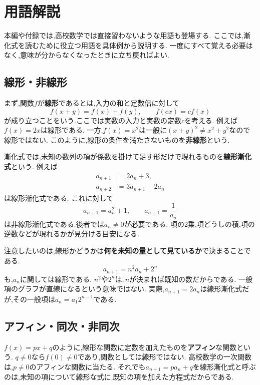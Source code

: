 
\section{用語解説}\label{節：用語解説}
  本編や付録では,高校数学では直接習わないような用語も登場する.
  ここでは,漸化式を読むために役立つ用語を具体例から説明する.
  一度にすべて覚える必要はなく,意味が分からなくなったときに立ち戻ればよい.

  \subsection{線形・非線形}\label{節：用語解説：線形・非線形}
    まず,関数$f$が\textbf{線形}であるとは,入力の和と定数倍に対して
    \[
      f(x+y)=f(x)+f(y),\qquad
      f(cx)=cf(x)
    \]
    が成り立つことをいう.ここでは実数の入力と実数の定数$c$を考える.
    例えば$f(x)=2x$は線形である.
    一方,$f(x)=x^2$は一般に$(x+y)^2\ne x^2+y^2$なので線形ではない.
    このように,線形の条件を満たさないものを\textbf{非線形}という.

    漸化式では,未知の数列の項が係数を掛けて足す形だけで現れるものを\textbf{線形漸化式}という.
    例えば
    \begin{align*}
      a_{n+1}&=2a_n+3,\\
      a_{n+2}&=3a_{n+1}-2a_n
    \end{align*}
    は線形漸化式である.
    これに対して
    \[
      a_{n+1}=a_n^2+1,\qquad
      a_{n+1}=\frac{1}{a_n}
    \]
    は非線形漸化式である.後者では$a_n\ne0$が必要である.
    項の2乗,項どうしの積,項の逆数などが現れるかが見分ける目安になる.

    注意したいのは,線形かどうかは\textbf{何を未知の量として見ているか}で決まることである.
    \[
      a_{n+1}=n^2a_n+2^n
    \]
    も,$a_n$に関しては線形である.
    $n^2$や$2^n$は,\,$n$が決まれば既知の数だからである.
    一般項のグラフが直線になるという意味ではない.
    実際,$a_{n+1}=2a_n$は線形漸化式だが,その一般項は$a_n=a_1 2^{n-1}$である.

  \subsection{アフィン・同次・非同次}\label{節：用語解説：アフィン・同次・非同次}
    $f(x)=px+q$のように,線形な関数に定数を加えたものを\textbf{アフィン}な関数という.
    $q\ne0$なら$f(0)\ne0$であり,関数としては線形ではない.
    高校数学の一次関数は,$p\ne0$のアフィンな関数に当たる.
    それでも$a_{n+1}=pa_n+q$を線形漸化式と呼ぶのは,未知の項について線形な式に,既知の項を加えた方程式だからである.

